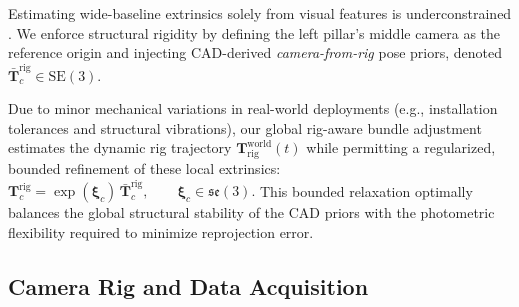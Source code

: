 \documentclass[letterpaper, 10 pt, conference]{ieeeconf}  %
\begin{document}









Estimating wide-baseline extrinsics solely from visual features is underconstrained \cite{guo2025robust}. We enforce structural rigidity by defining the left pillar's middle camera as the reference origin and injecting CAD-derived \emph{camera-from-rig} pose priors, denoted $\bar{\mathbf{T}}^{\text{rig}}_{c} \in \mathrm{SE}(3)$. 

Due to minor mechanical variations in real-world deployments (e.g., installation tolerances and structural vibrations), our global rig-aware bundle adjustment estimates the dynamic rig trajectory $\mathbf{T}^{\text{world}}_{\text{rig}}(t)$ while permitting a regularized, bounded refinement of these local extrinsics:$
    \mathbf{T}^{\text{rig}}_{c} = \exp(\boldsymbol{\xi}_c)\,\bar{\mathbf{T}}^{\text{rig}}_{c}, \qquad \boldsymbol{\xi}_c \in \mathfrak{se}(3).
$
This bounded relaxation optimally balances the global structural stability of the CAD priors with the photometric flexibility required to minimize reprojection error.












\subsection{Camera Rig and Data Acquisition}
\label{subsec:methodology_camera_rig_and_data_acquisition}

\end{document}

